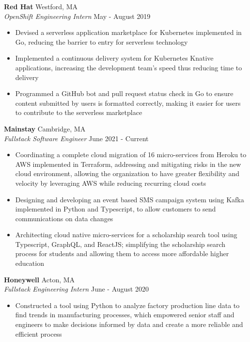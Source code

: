 \documentclass[10pt]{article}
\begin{document}
\begin{flushleft}
	\textbf{Red Hat} \hfill Westford, MA \\
	\textit{OpenShift Engineering Intern} \hfill May - August 2019 \\
	\begin{itemize}
		\item Devised a serverless application marketplace for Kubernetes implemented in Go, reducing the barrier to entry for serverless technology
		 
		\item Implemented a continuous delivery system for Kubernetes Knative applications, increasing the development team's speed thus reducing time to delivery
 
		\item Programmed a GitHub bot and pull request status check in Go to ensure content submitted by users is formatted correctly, making it easier for users to contribute to the serverless marketplace
	 \end{itemize}

	\textbf{Mainstay} \hfill Cambridge, MA \\
	\textit{Fullstack Software Engineer} \hfill June 2021 - Current \\
    \begin{itemize}
		\item Coordinating a complete cloud migration of 16 micro-services from Heroku to AWS implemented in Terraform, addressing and mitigating risks in the new cloud environment, allowing the organization to have greater flexibility and velocity by leveraging AWS while reducing recurring cloud costs

		\item Designing and developing an event based SMS campaign system using Kafka implemented in Python and Typescript, to allow customers to send communications on data changes

        \item Architecting cloud native micro-services for a scholarship search tool using Typescript, GraphQL, and ReactJS; simplifying the scholarship search process for students and allowing them to access more affordable higher education
	\end{itemize}

	\textbf{Honeywell} \hfill Acton, MA \\
	\textit{Fullstack Engineering Intern} \hfill June - August 2020 \\
    \begin{itemize}
        \item Constructed a tool using Python to analyze factory production line data to find trends in manufacturing processes, which empowered senior staff and engineers to make decisions informed by data and create a more reliable and efficient process


\end{itemize}
\end{flushleft}
\end{document}
